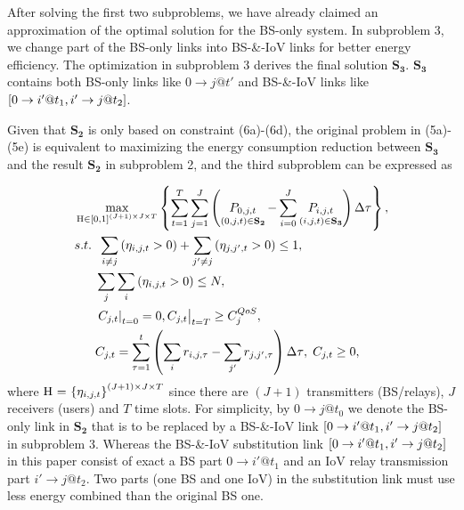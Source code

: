 \documentclass[conference]{IEEEtran}
\begin{document}
After solving the first two subproblems, we have already claimed an approximation of the optimal solution for the BS-only system. 
In subproblem 3, we change part of the BS-only links into BS-\&-IoV links for better energy efficiency. The optimization in subproblem 3 derives the final solution ${{\mathbf{S}}_{\mathbf{3}}}$. ${{\mathbf{S}}_{\mathbf{3}}}$ contains both BS-only links like $0 \to j@t'$ and BS-\&-IoV links like $\left[ {{\rm{0}} \to i'@{t_1},i' \to j@{t_2}} \right]$.

Given that ${{\mathbf{S}}_{\mathbf{2}}}$ is only based on constraint (6a)-(6d), the original problem in (5a)-(5e) is equivalent to maximizing the energy consumption reduction between ${{\mathbf{S}}_{\mathbf{3}}}$ and the result ${{\mathbf{S}}_{\mathbf{2}}}$ in subproblem 2, and the third subproblem can be expressed as

\begin{subequations}
\begin{align}
& \mathop {\max }\limits_{{\mathbf{{\rm H}}} \in {{\left[ {0,1} \right]}^{\left( {J + 1} \right) \times J \times T}}} \left\{ {\sum\limits_{t = 1}^T {\sum\limits_{j = 1}^J {\left( {\mathop {{P_{0,j,t}}}\limits_{\left( {0,j,t} \right) \in {{\mathbf{S}}_{\mathbf{2}}}}  - \sum\limits_{i = 0}^J {\mathop {{P_{i,j,t}}}\limits_{\left( {i,j,t} \right) \in {{\mathbf{S}}_{\mathbf{3}}}} } } \right)\Delta \tau } } } \right\}, \\
& {s.t.} \;\; \sum\limits_{i \ne j} {\left( {{\eta _{i,j,t}} > 0} \right)}  + \sum\limits_{j' \ne j} {\left( {{\eta _{j,j',t}} > 0} \right) \le {1}}, \\
& \;\;\;\;\;\; \sum\limits_j {\sum\limits_i {\left( {{\eta _{i,j,t}} > 0} \right)} }  \le N, \\
& \;\;\;\;\;\; {\left. {{{\left. {{C_{j,t}}} \right|}_{t = 0}} = 0, {C_{j,t}}} \right|_{t = T}} \ge C_j^{QoS}, \\
& \;\;\;\;\;\; {C_{j,t}} = \sum\limits_{\tau  = 1}^t {\left( {\sum\limits_i {{r_{i,j,\tau }}}  - \sum\limits_{j'} {{r_{j,j',\tau }}} } \right)\Delta \tau } ,\; {C_{j,t}} \ge 0,
\end{align}
\end{subequations}
where ${\mathbf{{\rm H}}}{\text{ = }}{\left\{ {{\eta _{i,j,t}}} \right\}^{\left( {J + 1} \right) \times J \times T}}$ since 
there are $\left( {J + 1} \right)$ transmitters (BS/relays), $J$ receivers (users) and $T$ time slots. For simplicity, by $0 \to j@{t_0}$ we denote the BS-only link in ${{\mathbf{S}}_{\mathbf{2}}}$ that is to be replaced by a BS-\&-IoV link $\left[ {{\rm{0}} \to i'@{t_1},i' \to j@{t_2}} \right]$ in subproblem 3. Whereas the BS-\&-IoV substitution link $\left[ {{\rm{0}} \to i'@{t_1},i' \to j@{t_2}} \right]$ in this paper consist of exact a BS part $0 \to i'@{t_1}$ and an IoV relay transmission part $i' \to j@{t_2}$. Two parts (one BS and one IoV) in the substitution link must use less energy combined than the original BS one.
\end{document}
